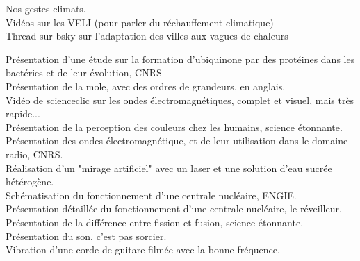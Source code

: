 
{\large {}}
\bigskip

Nos gestes climats.
\\[22pt]

Vidéos sur les VELI (pour parler du réchauffement climatique)
\\[22pt]

Thread sur bsky sur l'adaptation des villes aux vagues de chaleurs

Présentation d'une étude sur la formation d'ubiquinone par des protéines dans les bactéries et de leur évolution, CNRS
\\[8pt]

Présentation de la mole, avec des ordres de grandeurs, en anglais.
\\[22pt]


Vidéo de scienceclic sur les ondes électromagnétiques, complet et visuel, mais très rapide...
\\[22pt]

Présentation de la perception des couleurs chez les humains, science étonnante.
\\[22pt]

Présentation des ondes électromagnétique, et de leur utilisation dans le domaine radio, CNRS.
\\[8pt]

Réalisation d'un "mirage artificiel" avec un laser et une solution d'eau sucrée hétérogène.
\\[22pt]


Schématisation du fonctionnement d'une centrale nucléaire, ENGIE.
\\[22pt]

Présentation détaillée du fonctionnement d'une centrale nucléaire, le réveilleur.
\\[22pt]

Présentation de la différence entre fission et fusion, science étonnante.
\\[22pt]


Présentation du son, c'est pas sorcier.
\\[22pt]

Vibration d'une corde de guitare filmée avec la bonne fréquence.
\\[22pt]

